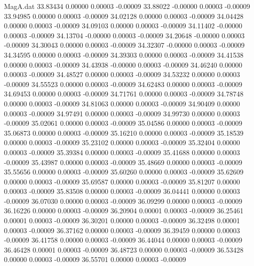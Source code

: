 \begin{filecontents}{MagA.dat}
  33.83434    0.00000    0.00003   -0.00009
  33.88022   -0.00000    0.00003   -0.00009
  33.94985    0.00000    0.00003   -0.00009
  34.02128    0.00000    0.00003   -0.00009
  34.04428    0.00000    0.00003   -0.00009
  34.09103    0.00000    0.00003   -0.00009
  34.11402   -0.00000    0.00003   -0.00009
  34.13704   -0.00000    0.00003   -0.00009
  34.20648   -0.00000    0.00003   -0.00009
  34.30043    0.00000    0.00003   -0.00009
  34.32307   -0.00000    0.00003   -0.00009
  34.34595    0.00000    0.00003   -0.00009
  34.39303    0.00000    0.00003   -0.00009
  34.41538    0.00000    0.00003   -0.00009
  34.43938   -0.00000    0.00003   -0.00009
  34.46240    0.00000    0.00003   -0.00009
  34.48527    0.00000    0.00003   -0.00009
  34.53232    0.00000    0.00003   -0.00009
  34.55523    0.00000    0.00003   -0.00009
  34.62483    0.00000    0.00003   -0.00009
  34.69453    0.00000    0.00003   -0.00009
  34.71761    0.00000    0.00003   -0.00009
  34.78748    0.00000    0.00003   -0.00009
  34.81063    0.00000    0.00003   -0.00009
  34.90409    0.00000    0.00003   -0.00009
  34.97491    0.00000    0.00003   -0.00009
  34.99730    0.00000    0.00003   -0.00009
  35.02061    0.00000    0.00003   -0.00009
  35.04586    0.00000    0.00003   -0.00009
  35.06873    0.00000    0.00003   -0.00009
  35.16210    0.00000    0.00003   -0.00009
  35.18539    0.00000    0.00003   -0.00009
  35.23102    0.00000    0.00003   -0.00009
  35.32404    0.00000    0.00003   -0.00009
  35.39384    0.00000    0.00003   -0.00009
  35.41688    0.00000    0.00003   -0.00009
  35.43987    0.00000    0.00003   -0.00009
  35.48669    0.00000    0.00003   -0.00009
  35.55656    0.00000    0.00003   -0.00009
  35.60260    0.00000    0.00003   -0.00009
  35.62609    0.00000    0.00003   -0.00009
  35.69587    0.00000    0.00003   -0.00009
  35.81207    0.00000    0.00003   -0.00009
  35.83508    0.00000    0.00003   -0.00009
  36.04441    0.00000    0.00003   -0.00009
  36.07030    0.00000    0.00003   -0.00009
  36.09299    0.00000    0.00003   -0.00009
  36.16226    0.00000    0.00003   -0.00009
  36.20904    0.00001    0.00003   -0.00009
  36.25461    0.00001    0.00003   -0.00009
  36.30201    0.00000    0.00003   -0.00009
  36.32498    0.00001    0.00003   -0.00009
  36.37162    0.00000    0.00003   -0.00009
  36.39459    0.00000    0.00003   -0.00009
  36.41758    0.00000    0.00003   -0.00009
  36.44044    0.00000    0.00003   -0.00009
  36.46428    0.00001    0.00003   -0.00009
  36.48723    0.00000    0.00003   -0.00009
  36.53428    0.00000    0.00003   -0.00009
  36.55701    0.00000    0.00003   -0.00009

\end{filecontents}
